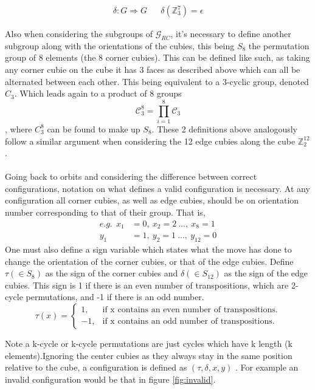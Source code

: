 \documentclass{article}
\newcounter{lem}[section]\setcounter{lem}{0}
\begin{document}
\begin{align}
	\delta : G \Rightarrow G && \delta(\mathbb{Z}_{3}^{7}) = \epsilon
\end{align}

Also when considering the subgroups of $\mathcal{G}_{RC}$, it's necessary to define another subgroup along with the orientations of the cubies, this being $S_{8}$ the permutation group of 8 elements (the 8 corner cubies). This can be defined like such, as taking any corner cubie on the cube it has 3 faces as described above which can all be alternated between each other. This being equivalent to a 3-cyclic group, denoted $C_{3}$. Which leads again to a product of 8 groups \[\mathcal{C}_{3}^8 = \prod_{i=1}^{8}\mathcal{C}_{3}\], where $C_{3}^{8}$ can be found to make up $S_{8}$. These 2 definitions above analogously follow a similar argument when considering the 12 edge cubies along the cube $\mathbb{Z}^{12}_{2}$.
\paragraph*{}
Going back to orbits and considering the difference between correct configurations, notation on what defines a valid configuration is necessary. At any configuration all corner cubies, as well as edge cubies, should be on orientation number corresponding to that of their group. That is,
\begin{align*}
e.g.\ \ x_1&=0,\ x_2=2\ ...,\ x_8=1\\
y_1&=1,\ y_2=1\ ... ,\ y_{12}=0
\end{align*}
One must also define a sign variable which states what the move has done to change the orientation of the corner cubies, or that of the edge cubies. 
Define $\tau (\in S_{8})$ as the sign of the corner cubies and $\delta (\in  S_{12})$ as the sign of the edge cubies. This sign is 1 if there is an even number of transpositions, which are 2-cycle permutations, and -1 if there is an odd number. 
\begin{equation}
  \tau(x)=\begin{cases}
    1, & \text{if x contains an even number of transpositions}.\\
    -1, & \text{if x contains an odd number of transpositions}.
  \end{cases}
\end{equation}

Note a k-cycle or k-cycle permutations are just cycles which have k length (k elements).\newline Ignoring the center cubies as they always stay in the same position relative to the cube, a configuration is defined as \textbf{$(\tau,\delta, x, y)$ }.
For example an invalid configuration would be that in figure \ref{fig:invalid}.
\end{document}
